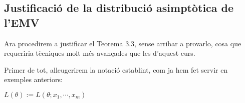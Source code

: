 \documentclass[letterpaper,10pt,english]{sphinxmanual}
\let\sphinxpxdimen\pdfpxdimen\else\newdimen\sphinxpxdimen
\begin{document}
\begin{sphinxVerbatim}[commandchars=\\\{\}]
   
   
   

  
  
     
  \PYG{n}{[i}\PYG{n}{]}  

    
    
    
\end{sphinxVerbatim}

\noindent{\hspace*{\fill}\sphinxincludegraphics[height=250\sphinxpxdimen]{{ex_asimptotic}.png}\hspace*{\fill}}


\subsection{Justificació de la distribució asimptòtica de l’EMV}
\label{\detokenize{0_Intro/0_3_Estimacio:justificacio-de-la-distribucio-asimptotica-de-l-emv}}
Ara procedirem a justificar el Teorema 3.3, sense arribar a provar\sphinxhyphen{}lo, cosa
que requeriria tècniques molt més avançades que les d’aquest curs.

Primer de tot, alleugerirem la notació establint, com ja hem fet servir
en exemples anteriors:

\(L(\theta) := L( \theta; x_1, \cdots, x_m)\)
\end{document}
